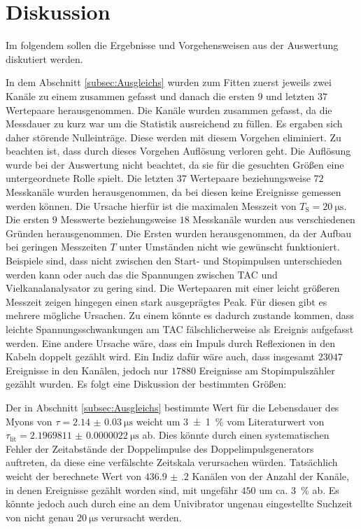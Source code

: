 
\section{Diskussion}
\label{sec:Diskussion}
Im folgendem sollen die Ergebnisse und Vorgehensweisen aus der Auswertung diskutiert werden.

In dem Abschnitt \ref{subsec:Ausgleichs} wurden zum Fitten zuerst jeweils zwei Kanäle zu einem zusammen gefasst und danach die ersten $9$ und letzten $37$ Wertepaare herausgenommen.
Die Kanäle wurden zusammen gefasst, da die Messdauer zu kurz war um die Statistik ausreichend zu füllen. Es ergaben sich daher störende Nulleinträge. Diese werden mit diesem Vorgehen eliminiert. Zu beachten ist, dass durch dieses Vorgehen Auflösung verloren geht. Die Auflösung wurde bei der Auswertung nicht beachtet, da sie für die gesuchten Größen eine untergeordnete Rolle spielt. Die letzten $37$ Wertepaare beziehungsweise $72$ Messkanäle wurden herausgenommen, da bei diesen keine Ereignisse gemessen werden können. Die Ursache hierfür ist die maximalen Messzeit von $T_\text{S}=\SI{20}{\micro\second}$. Die ersten $9$ Messwerte beziehungsweise $18$ Messkanäle wurden aus verschiedenen Gründen herausgenommen. Die Ersten wurden herausgenommen, da der Aufbau bei geringen Messzeiten $T$ unter Umständen nicht wie gewünscht funktioniert. Beispiele sind, dass nicht zwischen den Start- und Stopimpulsen unterschieden werden kann oder auch das die Spannungen zwischen TAC und Vielkanalanalysator zu gering sind. Die Wertepaaren mit einer leicht größeren Messzeit zeigen hingegen einen stark ausgeprägtes Peak. Für diesen gibt es mehrere mögliche Ursachen. Zu einem könnte es dadurch zustande kommen, dass leichte Spannungsschwankungen am TAC fälschlicherweise als Ereignis aufgefasst werden. Eine andere Ursache wäre, dass ein Impuls  durch Reflexionen in den Kabeln doppelt gezählt wird. Ein Indiz dafür wäre auch, dass insgesamt $23047$ Ereignisse in den Kanälen, jedoch nur $17880$ Ereignisse am Stopimpulszähler gezählt wurden.
Es folgt eine Diskussion der bestimmten Größen:

Der in Abschnitt \ref{subsec:Ausgleichs} bestimmte Wert für die Lebensdauer des Myons von $\tau=\SI{2.14(3)}{\micro\second}$ weicht um \SI{3(1)}{\percent} vom Literaturwert von $\tau_\text{lit}=\SI{2.1969811(22)}{\micro\second}$ \cite{ParticlePhysics} ab. Dies könnte durch einen systematischen Fehler der Zeitabstände der Doppelimpulse des Doppelimpulsgenerators auftreten, da diese eine verfälschte Zeitskala verursachen würden. Tatsächlich weicht der berechnete Wert von $\num{436.9(2)}$ Kanälen von der Anzahl der Kanäle, in denen Ereignisse gezählt worden sind, mit ungefähr $450$ um ca. \SI{3}{\percent} ab. 
Es könnte jedoch auch durch eine an dem Univibrator ungenau eingestellte Suchzeit von nicht genau $\SI{20}{\micro\second}$ verursacht werden.

